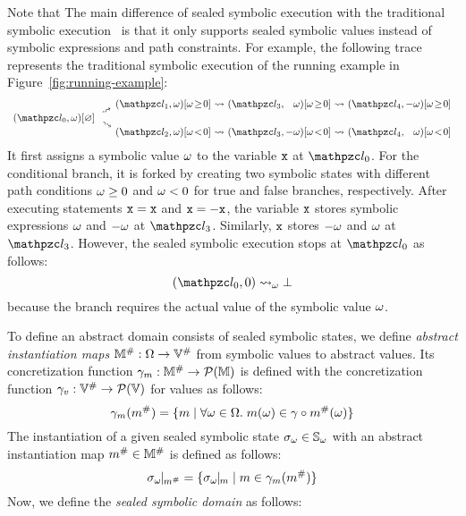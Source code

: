 Note that The main difference of sealed symbolic execution with the traditional
symbolic execution~\cite{symbolic} is that it only supports sealed symbolic
values instead of symbolic expressions and path constraints.  For example, the
following trace represents the traditional symbolic execution of the running
example in Figure~\ref{fig:running-example}:
{
\small
\[
  \begin{array}{r@{~}c@{~}c@{~}c@{~}r@{~}c@{~}r}
    &&(\lab_1, \symb)[\symb \!\geq\! 0]
    &\trans& (\lab_3, \phantom{-}\symb)[\symb \!\geq\! 0]
    &\trans& (\lab_4, -\symb)[\symb \!\geq\! 0]
    \vspace*{-0.5em}\\
    &\rutrans&
    \vspace*{-0.5em}\\
    (\lab_0, \symb)[\varnothing]
    \vspace*{-0.5em}\\
    &\rdtrans&
    \vspace*{-0.5em}\\
    &&(\lab_2, \symb)[\symb \!<\! 0]
    &\trans& (\lab_3, -\symb)[\symb \!<\! 0]
    &\trans& (\lab_4, \phantom{-}\symb)[\symb \!<\! 0]\\
  \end{array}
\]
}
It first assigns a symbolic value $\omega$ to the variable $\texttt{x}$ at $\lab_0$.
For the conditional branch, it is forked by creating two symbolic states with
different path conditions $\omega \geq 0$ and $\omega < 0$ for true and false
branches, respectively.  After executing statements $\texttt{x} = \texttt{x}$ and $\texttt{x} =
-\texttt{x}$, the variable $\texttt{x}$ stores symbolic expressions $\omega$ and $-\omega$
at $\lab_3$. Similarly, $\texttt{x}$  stores $-\omega$ and $\omega$ at $\lab_3$.
However, the sealed symbolic execution stops at $\lab_0$ as follows:
\[
  (\lab_0, 0) \; \symbtrans \; \excst
\]
because the branch requires the actual value of the symbolic value $\omega$.

To define an abstract domain consists of sealed symbolic states, we define
\textit{abstract instantiation maps} ${\mathbb{M}}^{\#}: \Omega \rightarrow
{\mathbb{V}}^{\#}$ from symbolic values to abstract values.  Its concretization
function $\gamma_m: {\mathbb{M}}^{\#} \rightarrow \mathcal{P}(\mathbb{M})$ is defined
with the concretization function $\gamma_v: {\mathbb{V}}^{\#} \rightarrow
\mathcal{P}(\mathbb{V})$ for values as follows:
\[
  \gamma_m({m}^{\#}) = \{
    m \mid \forall \omega \in \Omega. \;
    m(\omega) \in \gamma \circ {m}^{\#}(\omega)
  \}
\]
The instantiation of a given sealed symbolic state ${\sigma}_\omega \in {\mathbb{S}}_\omega$ with
an abstract instantiation map ${m}^{\#} \in {\mathbb{M}}^{\#}$ is defined as follows:
\[
  \instant{\symbst}{\absimap} = \{ \instant{\symbst}{\imap} \mid \imap \in
  \imapgamma(\absimap) \}
\]
Now, we define the \textit{sealed symbolic domain} as follows:

